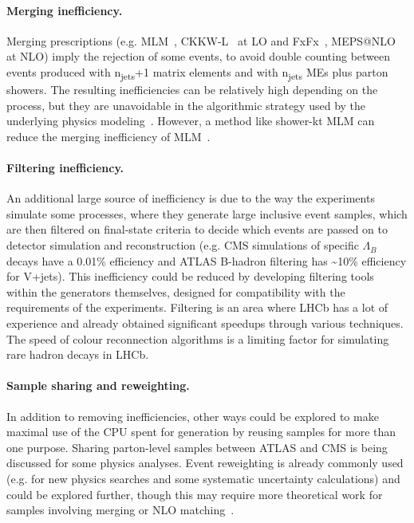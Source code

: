 \documentclass[11pt,a4paper]{article}
\begin{document}
\paragraph{Merging inefficiency.} Merging prescriptions (e.g. MLM~\cite{Man02},
CKKW-L~\cite{Lon02} at LO and FxFx~\cite{Fre12}, MEPS@NLO~\cite{Hoe14} at
NLO) imply the rejection of some events, to avoid double counting
between events produced with n\textsubscript{jets}+1 matrix elements and
with n\textsubscript{jets} MEs plus parton showers. The resulting
inefficiencies can be relatively high depending on the process, but they
are unavoidable in the algorithmic strategy used by the underlying
physics modeling~\cite{Alw08}. However, a method like shower-kt MLM can
reduce the merging inefficiency of MLM~\cite{Alw09}.

\paragraph{Filtering inefficiency.} An additional large source of inefficiency
is due to the way the experiments simulate some processes, where they
generate large inclusive event samples, which are then ﬁltered on
ﬁnal-state criteria to decide which events are passed on to detector
simulation and reconstruction (e.g. CMS simulations of specific
$\Lambda_{B}$ decays have a 0.01\% efficiency and ATLAS B-hadron
filtering has \textasciitilde10\% efficiency for V+jets). This
inefficiency could be reduced by developing ﬁltering tools within the
generators themselves, designed for compatibility with the requirements
of the experiments. Filtering is an area where LHCb has a lot of
experience and already obtained significant speedups through various
techniques. The speed of colour reconnection algorithms is a limiting
factor for simulating rare hadron decays in LHCb.

\paragraph{Sample sharing and reweighting.} In addition to removing
inefficiencies, other ways could be explored to make maximal use of the
CPU spent for generation by reusing samples for more than one purpose.
Sharing parton-level samples between ATLAS and CMS is being discussed
for some physics analyses. Event reweighting is already commonly used
(e.g. for new physics searches and some systematic uncertainty
calculations) and could be explored further, though this may require
more theoretical work for samples involving merging or NLO matching~\cite{Mat16}.
\end{document}
